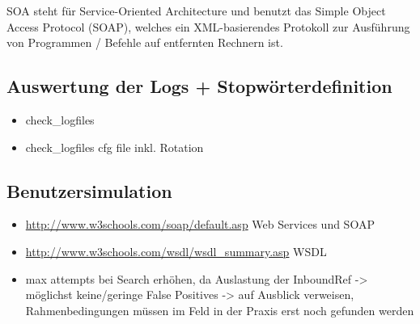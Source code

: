 \gls{SOA} steht für Service-Oriented Architecture und benutzt das Simple Object Access Protocol (\gls{SOAP}), welches ein \gls{XML}-basierendes Protokoll zur Ausführung von Programmen / Befehle auf entfernten Rechnern ist.

\subsection{Auswertung der Logs + Stopwörterdefinition}
\begin{itemize}
\item check\_logfiles
\item check\_logfiles cfg file inkl. Rotation
\end{itemize}

\subsection{Benutzersimulation}
\begin{itemize}
\item \url{http://www.w3schools.com/soap/default.asp} Web Services und SOAP
\item \url{http://www.w3schools.com/wsdl/wsdl_summary.asp} WSDL
\item max attempts bei Search erhöhen, da Auslastung der InboundRef -> möglichst keine/geringe False Positives -> auf Ausblick verweisen, Rahmenbedingungen müssen im Feld in der Praxis erst noch gefunden werden
\end{itemize}


